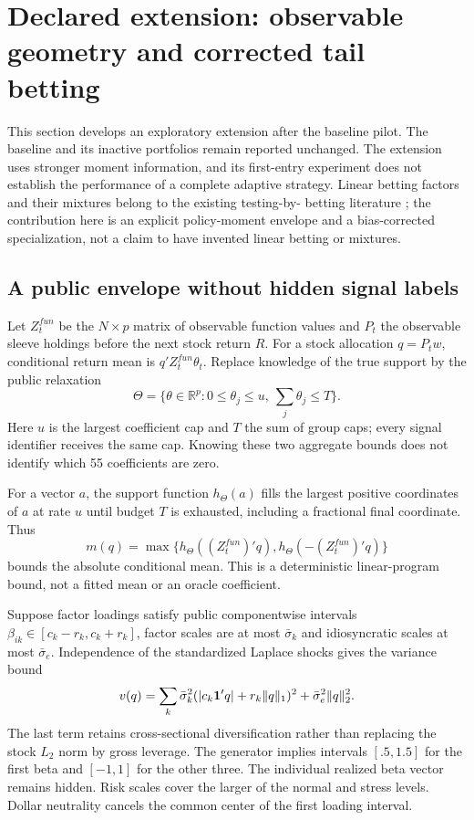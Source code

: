 \section{Declared extension: observable geometry and corrected tail betting}
\label{sec:tail-extension}
This section develops an exploratory extension after the baseline pilot.
The baseline and its inactive portfolios remain reported unchanged. The
extension uses stronger moment information, and its first-entry experiment
does not establish the performance of a complete adaptive strategy.
Linear betting factors and their mixtures belong to the existing testing-by-
betting literature \cite{boundedbet}; the contribution here is an explicit
policy-moment envelope and a bias-corrected specialization, not a claim to
have invented linear betting or mixtures.

\subsection{A public envelope without hidden signal labels}
Let $Z_t^{fun}$ be the $N\times p$ matrix of observable function values and
$P_t$ the observable sleeve holdings before the next stock return $R$.
For a stock allocation $q=P_tw$, conditional return mean is
$q'Z_t^{fun}\theta_t$. Replace knowledge of the true support by the public
relaxation
\[
 \Theta=\{\theta\in\mathbb R^p:0\le\theta_j\le u,
                          \ \textstyle\sum_j\theta_j\le T\}.
\]
Here $u$ is the largest coefficient cap and $T$ the sum of group caps; every
signal identifier receives the same cap. Knowing these two aggregate bounds
does not identify which 55 coefficients are zero.

For a vector $a$, the support function $h_\Theta(a)$ fills the largest
positive coordinates of $a$ at rate $u$ until budget $T$ is exhausted,
including a fractional final coordinate. Thus
\[
 m(q)=\max\{h_\Theta((Z_t^{fun})'q),
             h_\Theta(-(Z_t^{fun})'q)\}
\]
bounds the absolute conditional mean. This is a deterministic linear-program
bound, not a fitted mean or an oracle coefficient.

Suppose factor loadings satisfy public componentwise intervals
$\beta_{ik}\in[c_k-r_k,c_k+r_k]$, factor scales are at most $\bar\sigma_k$
and idiosyncratic scales at most $\bar\sigma_e$. Independence of the
standardized Laplace shocks gives the variance bound
\begin{equation}
 v(q)=\sum_k\bar\sigma_k^2
       (|c_k\mathbf 1'q|+r_k\lVert q\rVert_1)^2
       +\bar\sigma_e^2\lVert q\rVert_2^2.\label{eq:public-geometry}
\end{equation}
The last term retains cross-sectional diversification rather than replacing
the stock $L_2$ norm by gross leverage. The generator implies intervals
$[.5,1.5]$ for the first beta and $[-1,1]$ for the other three. The
individual realized beta vector remains hidden. Risk scales cover the larger
of the normal and stress levels. Dollar neutrality cancels the common center
of the first loading interval.

